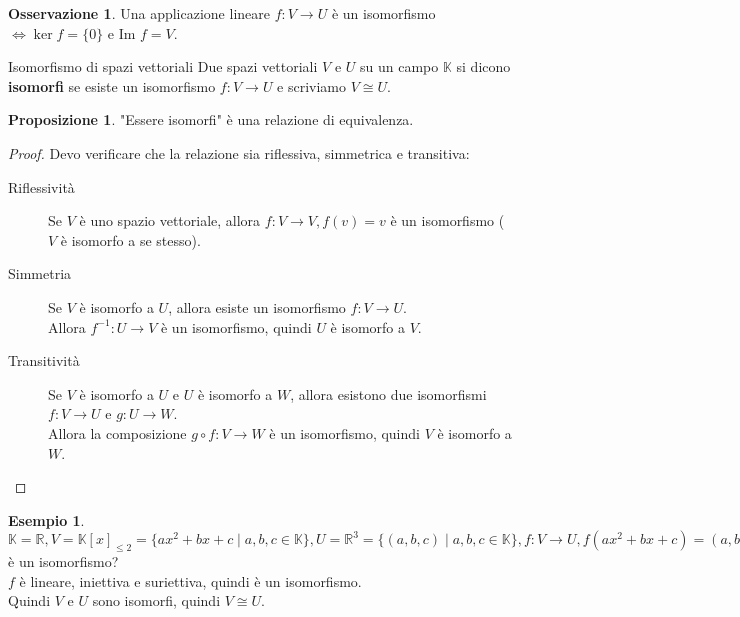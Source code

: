 \documentclass[a4paper]{article}
\theoremstyle{definition}
\newtheorem*{oss}{Osservazione}
\newtheorem*{es}{Esempio}
\newtheorem*{prop}{Proposizione}
\begin{document}
\begin{oss}
	Una applicazione lineare $f: V \rightarrow U$ è un isomorfismo $\Leftrightarrow \ker f = \{0\}$ e Im $f = V$.
\end{oss}

\begin{deff}{Isomorfismo di spazi vettoriali}{}
	Due spazi vettoriali $V$ e $U$ su un campo $\mathbb{K}$ si dicono \textbf{isomorfi} se esiste un isomorfismo $f: V \rightarrow U$ e scriviamo $V \cong U$.
\end{deff}
\begin{prop}
	"Essere isomorfi" è una relazione di equivalenza.
\end{prop}
\begin{proof}
	Devo verificare che la relazione sia riflessiva, simmetrica e transitiva:
	\begin{description}
		\item[Riflessività] Se $V$ è uno spazio vettoriale, allora $f: V \rightarrow V, f(v) = v$ è un isomorfismo ($V$ è isomorfo a se stesso).
		\item[Simmetria] Se $V$ è isomorfo a $U$, allora esiste un isomorfismo $f: V \rightarrow U$. \\
		      Allora $f^{-1}: U \rightarrow V$ è un isomorfismo, quindi $U$ è isomorfo a $V$.
		\item[Transitività] Se $V$ è isomorfo a $U$ e $U$ è isomorfo a $W$, allora esistono due isomorfismi $f: V \rightarrow U$ e $g: U \rightarrow W$. \\
		      Allora la composizione $g \circ f: V \rightarrow W$ è un isomorfismo, quindi $V$ è isomorfo a $W$.
	\end{description}
\end{proof}

\begin{es}
	$\mathbb{K} = \mathbb{R}, V = \mathbb{K}[x]_{\le 2} = \{ax^2 + bx + c \mid a, b, c \in \mathbb{K}\}, U = \mathbb{R}^3 = \{(a, b, c) \mid a, b, c \in \mathbb{K}\}, f: V \rightarrow U, f(ax^2 + bx + c) = (a, b, c)$ è un isomorfismo? \\
	$f$ è lineare, iniettiva e suriettiva, quindi è un isomorfismo. \\
	Quindi $V$ e $U$ sono isomorfi, quindi $V \cong U$.
\end{es}
\end{document}
